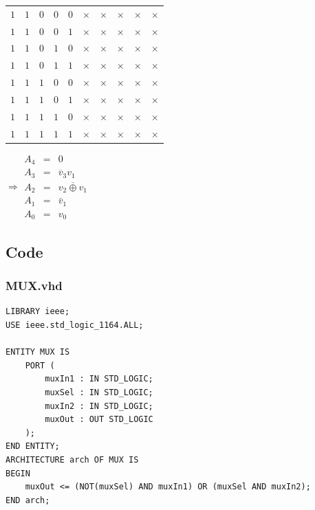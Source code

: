 \documentclass[13pt,a4paper]{report}
\begin{document}
\begin{minipage}[t]{0.6\textwidth}
\begin{table}[H]
\begin{tabular}{ccccc|ccccc}
$1$&$1$&$0$&$0$&$0$&$\times$&$\times$&$\times$&$\times$&$\times$\\
$1$&$1$&$0$&$0$&$1$&$\times$&$\times$&$\times$&$\times$&$\times$\\
$1$&$1$&$0$&$1$&$0$&$\times$&$\times$&$\times$&$\times$&$\times$\\
$1$&$1$&$0$&$1$&$1$&$\times$&$\times$&$\times$&$\times$&$\times$\\
$1$&$1$&$1$&$0$&$0$&$\times$&$\times$&$\times$&$\times$&$\times$\\
$1$&$1$&$1$&$0$&$1$&$\times$&$\times$&$\times$&$\times$&$\times$\\
$1$&$1$&$1$&$1$&$0$&$\times$&$\times$&$\times$&$\times$&$\times$\\
$1$&$1$&$1$&$1$&$1$&$\times$&$\times$&$\times$&$\times$&$\times$\\
\end{tabular}

$\Rightarrow \begin{array}{rcl}
A_4 & = & 0 \\
A_3 & = & \overline v_3 v_1 \\
A_2 & = & \overline{v_2 \oplus v_1} \\
A_1 & = & \bar v_1\\
A_0 & = & v_0
\end{array}$
\end{table}
\end{minipage}

\subsection{Code}

\subsubsection{MUX.vhd}
\begin{verbatim}
LIBRARY ieee;
USE ieee.std_logic_1164.ALL;

ENTITY MUX IS
	PORT (
		muxIn1 : IN STD_LOGIC;
		muxSel : IN STD_LOGIC;
		muxIn2 : IN STD_LOGIC;
		muxOut : OUT STD_LOGIC
	);
END ENTITY;
ARCHITECTURE arch OF MUX IS
BEGIN
	muxOut <= (NOT(muxSel) AND muxIn1) OR (muxSel AND muxIn2);
END arch;
\end{verbatim}
\end{document}
